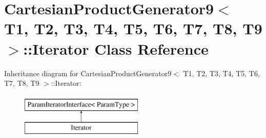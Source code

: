 \hypertarget{classtesting_1_1internal_1_1CartesianProductGenerator9_1_1Iterator}{\section{\-Cartesian\-Product\-Generator9$<$ \-T1, \-T2, \-T3, \-T4, \-T5, \-T6, \-T7, \-T8, \-T9 $>$\-:\-:\-Iterator \-Class \-Reference}
\label{d9/d75/classtesting_1_1internal_1_1CartesianProductGenerator9_1_1Iterator}
}
\-Inheritance diagram for \-Cartesian\-Product\-Generator9$<$ \-T1, \-T2, \-T3, \-T4, \-T5, \-T6, \-T7, \-T8, \-T9 $>$\-:\-:\-Iterator\-:\begin{figure}[H]
\begin{center}
\leavevmode
\includegraphics[height=2.000000cm]{d9/d75/classtesting_1_1internal_1_1CartesianProductGenerator9_1_1Iterator}
\end{center}
\end{figure}
